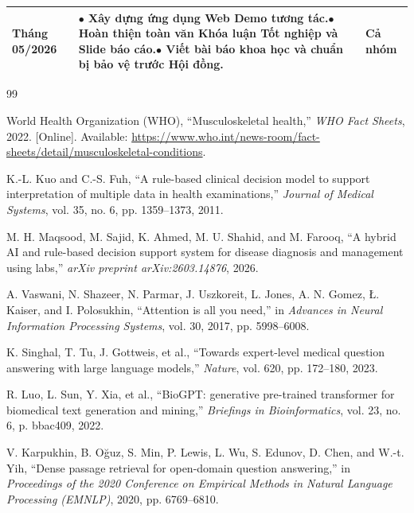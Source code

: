 \documentclass[12pt,a4paper]{article}
\begin{document}
\begin{table}[htbp]
\begin{tabularx}{\textwidth}{|p{2.8cm}|X|p{2.6cm}|}
\textbf{Tháng 05/2026} & $\bullet$ Xây dựng ứng dụng Web Demo tương tác.\newline $\bullet$ Hoàn thiện toàn văn Khóa luận Tốt nghiệp và Slide báo cáo.\newline $\bullet$ Viết bài báo khoa học và chuẩn bị bảo vệ trước Hội đồng. & \textbf{Cả nhóm} \\ \hline
\end{tabularx}
\end{table}

\begin{thebibliography}{99}
\fontsize{11pt}{14pt}\selectfont

World Health Organization (WHO), ``Musculoskeletal health,'' \textit{WHO Fact Sheets}, 2022. [Online]. Available: \url{https://www.who.int/news-room/fact-sheets/detail/musculoskeletal-conditions}.

K.-L. Kuo and C.-S. Fuh, ``A rule-based clinical decision model to support interpretation of multiple data in health examinations,'' \textit{Journal of Medical Systems}, vol. 35, no. 6, pp. 1359--1373, 2011.

M. H. Maqsood, M. Sajid, K. Ahmed, M. U. Shahid, and M. Farooq, ``A hybrid AI and rule-based decision support system for disease diagnosis and management using labs,'' \textit{arXiv preprint arXiv:2603.14876}, 2026.

A. Vaswani, N. Shazeer, N. Parmar, J. Uszkoreit, L. Jones, A. N. Gomez, Ł. Kaiser, and I. Polosukhin, ``Attention is all you need,'' in \textit{Advances in Neural Information Processing Systems}, vol. 30, 2017, pp. 5998--6008.

K. Singhal, T. Tu, J. Gottweis, et al., ``Towards expert-level medical question answering with large language models,'' \textit{Nature}, vol. 620, pp. 172--180, 2023.

R. Luo, L. Sun, Y. Xia, et al., ``BioGPT: generative pre-trained transformer for biomedical text generation and mining,'' \textit{Briefings in Bioinformatics}, vol. 23, no. 6, p. bbac409, 2022.

V. Karpukhin, B. Oğuz, S. Min, P. Lewis, L. Wu, S. Edunov, D. Chen, and W.-t. Yih, ``Dense passage retrieval for open-domain question answering,'' in \textit{Proceedings of the 2020 Conference on Empirical Methods in Natural Language Processing (EMNLP)}, 2020, pp. 6769--6810.


\end{thebibliography}
\end{document}
